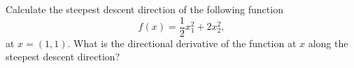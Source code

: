
 Calculate the steepest descent direction of the
  following function
  \[
  f(x)=  \frac{1}{2}x_1^2+2x_2^2,
  \]
  at  $x= (1,1)$.
What is the directional derivative of the function at $x$ along the
steepest descent direction? 



